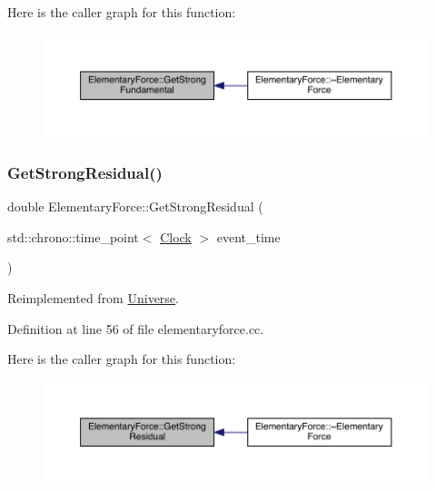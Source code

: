 Here is the caller graph for this function\+:
\nopagebreak
\begin{figure}[H]
\begin{center}
\leavevmode
\includegraphics[width=350pt]{class_elementary_force_a0974d6537c07dac2453d2a607324fa21_icgraph}
\end{center}
\end{figure}
\mbox{\label{class_elementary_force_a3478c8ad35bce240055da7d4a03e555e}} 
\subsubsection{\texorpdfstring{Get\+Strong\+Residual()}{GetStrongResidual()}}
{\footnotesize\ttfamily double Elementary\+Force\+::\+Get\+Strong\+Residual (\begin{DoxyParamCaption}\item[{std\+::chrono\+::time\+\_\+point$<$ \hyperlink{universe_8h_a0ef8d951d1ca5ab3cfaf7ab4c7a6fd80}{Clock} $>$}]{event\+\_\+time }\end{DoxyParamCaption})\hspace{0.3cm}{\ttfamily [virtual]}}



Reimplemented from \hyperlink{class_universe_af0f4b81950061e63c2855eb40957a5b1}{Universe}.



Definition at line 56 of file elementaryforce.\+cc.

Here is the caller graph for this function\+:
\nopagebreak
\begin{figure}[H]
\begin{center}
\leavevmode
\includegraphics[width=350pt]{class_elementary_force_a3478c8ad35bce240055da7d4a03e555e_icgraph}
\end{center}
\end{figure}
\mbox{\label{class_elementary_force_a4669f2ce414e508c70ae4ce0df503ad1}} 
